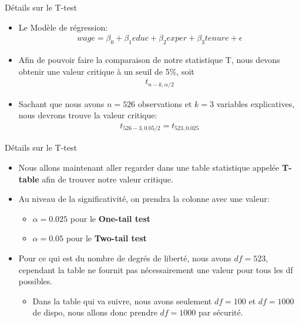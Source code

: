 \documentclass{beamer}
\begin{document}
\begin{frame}{Détails sur le T-test}

\begin{itemize}
\item Le Modèle de régression:
\begin{align*}
wage = \beta_0 + \beta_1 educ +\beta_2 exper + \beta_3 tenure  + \epsilon
\end{align*}
\item Afin de pouvoir faire la comparaison de notre statistique T, nous devons obtenir une valeur critique à un seuil de 5\%, soit 
\begin{align*}
t_{n-k,\alpha/2}
\end{align*}
\item Sachant que nous avons $n=526$ observations et $k=3$ variables explicatives, nous devrons trouve la valeur critique:
\begin{align*}
t_{526-3,0.05/2}=t_{523,0.025}
\end{align*}

\end{itemize}

\end{frame}

\begin{frame}{Détails sur le T-test}

\begin{itemize}
\item Nous allons maintenant aller regarder dans une table statistique appelée \textbf{T-table} afin de trouver notre valeur critique.
\item Au niveau de la significativité, on prendra la colonne avec une valeur: 
\begin{itemize}
\item $\alpha= 0.025$ pour le \textbf{One-tail test}
\item $\alpha= 0.05$ pour le \textbf{Two-tail test}
\end{itemize}
\item Pour ce qui est du nombre de degrés de liberté, nous avons $df=523$, cependant la table ne fournit pas nécessairement une valeur pour tous les df possibles.
\begin{itemize}
\item Dans la table qui va suivre, nous avons seulement $df=100$ et $df=1000$ de dispo, nous allons donc prendre $df=1000$ par sécurité.
\end{itemize}
\end{itemize}

\end{frame}
\end{document}
